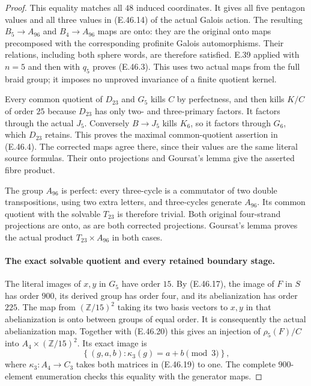 \begin{proof}
This equality matches all $48$ induced coordinates.
It gives all five pentagon values and all three values
in \textup{(E.46.14)} of the actual Galois action.
The resulting $B_5\to A_{96}$ and $B_4\to A_{96}$
maps are onto: they are the original onto maps
precomposed with the corresponding profinite Galois
automorphisms.  Their relations, including both sphere
words, are therefore satisfied.  E.39 applied with
$n=5$ and then with $q_5$ proves \textup{(E.46.3)}.
This uses two actual maps from the full braid group;
it imposes no unproved invariance of a finite quotient kernel.

Every common quotient of $D_{23}$ and $G_5$ kills $C$
by perfectness, and then kills $K/C$ of order $25$
because $D_{23}$ has only two- and three-primary factors.
It factors through the actual $J_5$.
Conversely $B\to J_5$ kills $K_6$, so it factors through
$G_6$, which $D_{23}$ retains.  This proves the maximal
common-quotient assertion in \textup{(E.46.4)}.
The corrected maps agree there, since their values are
the same literal source formulas.  Their onto projections
and Goursat's lemma give the asserted fibre product.

The group $A_{96}$ is perfect: every three-cycle is a
commutator of two double transpositions, using two extra
letters, and three-cycles generate $A_{96}$.
Its common quotient with the solvable $T_{23}$ is therefore
trivial.  Both original four-strand projections are onto,
as are both corrected projections.  Goursat's lemma proves
the actual product $T_{23}\times A_{96}$ in both cases.

\paragraph{The exact solvable quotient and every retained boundary stage.}
The literal images of $x,y$ in $G_5$ have order $15$.
By \textup{(E.46.17)}, the image of $F$ in $S$ has
order $900$, its derived group has order four, and its
abelianization has order $225$.  The map from
$(\mathbb Z/15)^2$ taking its two basis vectors to $x,y$
in that abelianization is onto between groups of equal
order.  It is consequently the actual abelianization map.
Together with \textup{(E.46.20)} this gives an injection
of $\rho_5(F)/C$ into $A_4\times(\mathbb Z/15)^2$.
Its exact image is
\[
 \left\{(g,a,b):\kappa_3(g)=a+b\pmod3\right\},
 \tag{E.46.22}
\]
where $\kappa_3:A_4\to C_3$ takes both matrices in
\textup{(E.46.19)} to one.  The complete $900$-element
enumeration checks this equality with the generator maps.


\end{proof}
